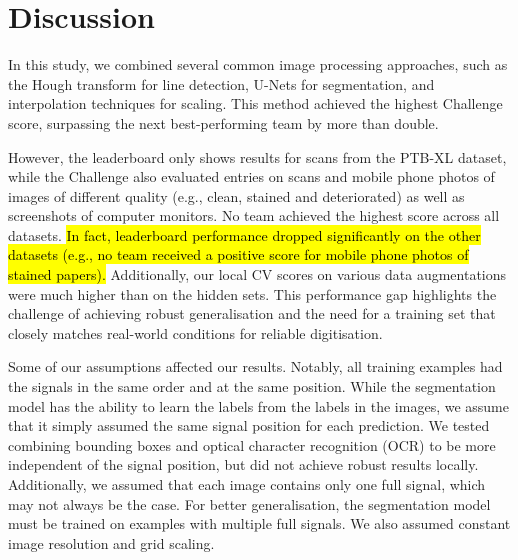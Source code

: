 \documentclass[twocolumn]{cinc}
\newcommand{\cG}[1]{{\sethlcolor{cGapBg}\hl{#1}}}
\begin{document}
\section{Discussion}
In this study, we combined several common image processing approaches, such as the Hough transform for line detection, U-Nets for segmentation, and interpolation techniques for scaling. This method achieved the highest Challenge score, surpassing the next best-performing team by more than double.

However, the leaderboard only shows results for scans from the PTB-XL dataset, while the Challenge also evaluated entries on scans and mobile phone photos of images of different quality (e.g., clean, stained and deteriorated) as well as screenshots of computer monitors. No team achieved the highest score across all datasets. \cG{In fact, leaderboard performance dropped significantly on the other datasets (e.g., no team received a positive score for mobile phone photos of stained papers).} Additionally, our local CV scores on various data augmentations were much higher than on the hidden sets. This performance gap highlights the challenge of achieving robust generalisation and the need for a training set that closely matches real-world conditions for reliable digitisation.

Some of our assumptions affected our results. Notably, all training examples had the signals in the same order and at the same position. While the segmentation model has the ability to learn the labels from the labels in the images, we assume that it simply assumed the same signal position for each prediction. We tested combining bounding boxes and optical character recognition (OCR) to be more independent of the signal position, but did not achieve robust results locally. Additionally, we assumed that each image contains only one full signal, which may not always be the case. For better generalisation, the segmentation model must be trained on examples with multiple full signals. We also assumed constant image resolution and grid scaling. 

\end{document}
